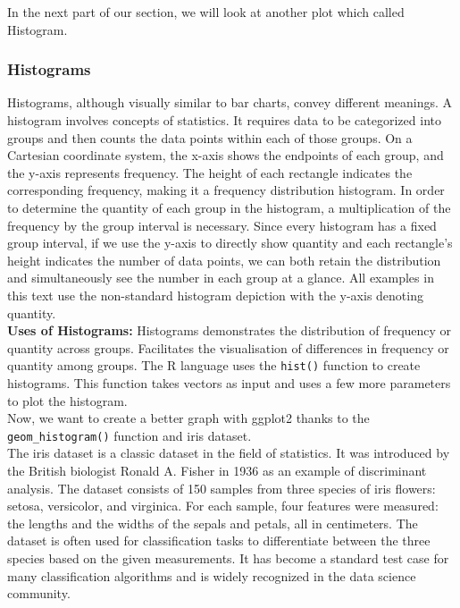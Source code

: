 \documentclass{article}\usepackage[]{graphicx}\usepackage[]{xcolor}
\begin{document}
In the next part of our section, we will look at another plot which called Histogram.
\subsubsection{Histograms}
Histograms, although visually similar to bar charts, convey different meanings. A histogram involves concepts of statistics. It requires data to be categorized into groups and then counts the data points within each of those groups. On a Cartesian coordinate system, the x-axis shows the endpoints of each group, and the y-axis represents frequency. The height of each rectangle indicates the corresponding frequency, making it a frequency distribution histogram. In order to determine the quantity of each group in the histogram, a multiplication of the frequency by the group interval is necessary. Since every histogram has a fixed group interval, if we use the y-axis to directly show quantity and each rectangle's height indicates the number of data points, we can both retain the distribution and simultaneously see the number in each group at a glance. All examples in this text use the non-standard histogram depiction with the y-axis denoting quantity.\\
\textbf{Uses of Histograms:}
Histograms demonstrates the distribution of frequency or quantity across groups. Facilitates the visualisation of differences in frequency or quantity among groups. The R language uses the \texttt{hist()} function to create histograms. This function takes vectors as input and uses a few more parameters to plot the histogram.\\
Now, we want to create a better graph with ggplot2 thanks to the \texttt{geom\_histogram()} function and iris dataset.\\
The iris dataset is a classic dataset in the field of statistics. It was introduced by the British biologist Ronald A. Fisher in 1936 as an example of discriminant analysis. The dataset consists of 150 samples from three species of iris flowers: setosa, versicolor, and virginica. For each sample, four features were measured: the lengths and the widths of the sepals and petals, all in centimeters. The dataset is often used for classification tasks to differentiate between the three species based on the given measurements. It has become a standard test case for many classification algorithms and is widely recognized in the data science community.\\
\end{document}
